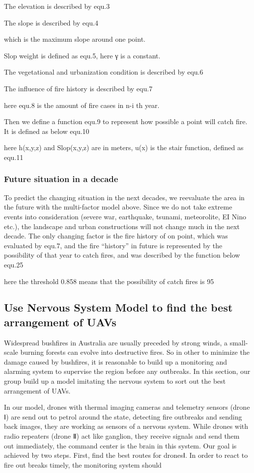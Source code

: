 \documentclass[13pt]{ctexart} %
\begin{document}
The elevation is described by {equ.3}

The slope is described by {equ.4}

which is the maximum slope around one point.

Slop weight is defined as {equ.5}, here γ is a constant.

The vegetational and urbanization condition is described by {equ.6}

The influence of fire history is described by {equ.7}

here {equ.8} is the amount of fire cases in n-i th year.


Then we define a function {equ.9} to represent how possible a point will catch fire. It is defined as below {equ.10}

here h(x,y,z) and Slop(x,y,z) are in meters, u(x) is the stair function, defined as {equ.11}


\subsubsection{Future situation in a decade}
To predict the changing situation in the next decades, we reevaluate the area in the future with the multi-factor model above. Since we do not take extreme events into consideration (severe war, earthquake, tsunami, meteorolite, EI Nino etc.), the landscape and urban constructions will not change much in the next decade. The only changing factor is the fire history of on point, which was evaluated by {equ.7}, and the fire “history” in future is represented by the possibility of that year to catch fires, and was described by the function below
    {equ.25}

here the threshold 0.858 means that the possibility of catch fires is 95%


\subsection{Use Nervous System Model to find the best arrangement of UAVs}
Widespread bushfires in Australia are usually preceded by strong winds, a small-scale burning forests can evolve into destructive fires. So in other to minimize the damage caused by bushfires, it is reasonable to build up a monitoring and alarming system to supervise the region before any outbreaks. In this section, our group build up a model imitating the nervous system to sort out the best arrangement of UAVs.

In our model, drones with thermal imaging cameras and telemetry sensors (drone Ⅰ) are send out to petrol around the state, detecting fire outbreaks and sending back images, they are working as sensors of a nervous system. While drones with radio repeaters (drone Ⅱ) act like ganglion, they receive signals and send them out immediately, the command center is the brain in this system. Our goal is achieved by two steps. First, find the best routes for dronesⅠ. In order to react to fire out breaks timely, the monitoring system should
\end{document}
